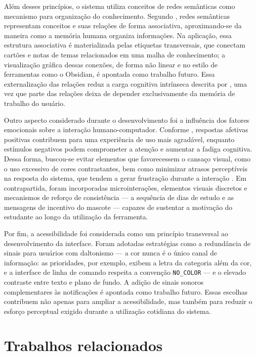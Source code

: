 \documentclass[12pt, %
openright, 
oneside,
a4paper,
english,   %
brazil]{facom-ufu-abntex2}
\begin{document}
Além desses princípios, o sistema utiliza conceitos de redes semânticas como
mecanismo para organização do conhecimento. Segundo
, redes semânticas representam conceitos e suas relações de
forma associativa, aproximando-se da maneira como a memória humana organiza
informações. Na aplicação, essa estrutura associativa é materializada pelas
etiquetas transversais, que conectam cartões e notas de temas relacionados em
uma malha de conhecimento; a visualização gráfica dessas conexões, de forma
não linear e no estilo de ferramentas como o Obsidian, é apontada como
trabalho futuro. Essa externalização das relações reduz a carga cognitiva
intrínseca descrita por , uma vez que parte das
relações deixa de depender exclusivamente da memória de trabalho do usuário.

Outro aspecto considerado durante o desenvolvimento foi a influência dos
fatores emocionais sobre a interação humano-computador. Conforme
, respostas afetivas positivas contribuem para uma
experiência de uso mais agradável, enquanto estímulos negativos podem
comprometer a atenção e aumentar a fadiga cognitiva. Dessa forma, buscou-se
evitar elementos que favorecessem o cansaço visual, como o uso excessivo de
cores contrastantes, bem como minimizar atrasos perceptíveis na resposta do
sistema, que tendem a gerar frustração durante a interação
\cite{MacKenzie1992}. Em contrapartida, foram incorporadas microinterações,
elementos visuais discretos e mecanismos de reforço de consistência --- a
sequência de dias de estudo e as mensagens de incentivo do mascote --- capazes
de sustentar a motivação do estudante ao longo da utilização da ferramenta.

Por fim, a acessibilidade foi considerada como um princípio transversal ao
desenvolvimento da interface. Foram adotadas estratégias como a redundância de
sinais para usuários com daltonismo --- a cor nunca é o único canal de
informação: as prioridades, por exemplo, exibem a letra da categoria além da
cor, e a interface de linha de comando respeita a convenção
\texttt{NO\_COLOR} --- e o elevado contraste entre texto e plano de fundo. A
adição de sinais sonoros complementares às notificações é apontada como
trabalho futuro. Essas escolhas contribuem não apenas para ampliar a
acessibilidade, mas também para reduzir o esforço perceptual exigido durante a
utilização cotidiana do sistema.

\section{Trabalhos relacionados}
\label{sec:trabalhos-relacionados}
\end{document}

